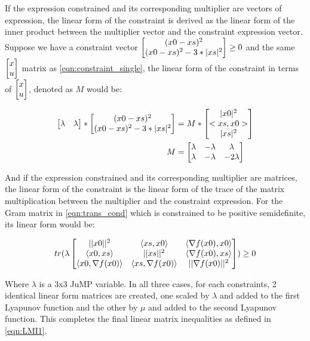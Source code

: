 If the expression constrained and its corresponding multiplier are vectors of expression, the linear form of the constraint is derived as the linear form of the inner product between the multiplier vector and the constraint expression vector. Suppose we have a constraint vector $\begin{bmatrix}(x0-xs)^2 \\ (x0-xs)^2-3*|xs|^2\end{bmatrix} \geq 0$ and the same $\begin{bmatrix}x\\ u\end{bmatrix}$ matrix as \eqref{eqn:constraint_single}, the linear form of the constraint in terms of $\begin{bmatrix}x\\ u\end{bmatrix}$, denoted as $M$ would be:

\begin{subequations} \label{eqn:constraint_vector}
	\begin{align}
    \begin{bmatrix}\lambda  & \lambda \end{bmatrix} * \begin{bmatrix}(x0 - xs)^2 \\ (x0 - xs)^2-3*|xs|^2\end{bmatrix} &= M * \begin{bmatrix}|x0|^2\\ <xs, x0>\\ |xs|^2\end{bmatrix} \label{eq_cons_vector1}       \\
	M &= \begin{bmatrix}\lambda & -\lambda & \lambda \\ \lambda & -\lambda & -2\lambda\end{bmatrix} \label{eq_cons_vector2}
	\end{align}
\end{subequations}

And if the expression constrained and its corresponding multiplier are matrices, the linear form of the constraint is the linear form of the trace of the matrix multiplication between the multiplier and the constraint expression. For the Gram matrix in \eqref{eqn:trans_cond} which is constrained to be positive semidefinite, its linear form would be:

\begin{equation} \label{eqn:trans_cond}
	tr(\lambda \begin{bmatrix}||x0||^2 & \langle xs, x0 \rangle & \langle \nabla f(x0), x0 \rangle \\ \langle x0, xs \rangle & ||xs||^2 & \langle \nabla f(x0), xs \rangle \\ \langle x0, \nabla f(x0) \rangle & \langle xs, \nabla f(x0) \rangle & ||\nabla f(x0)||^2\end{bmatrix}) \geq 0	
\end{equation}

Where $\lambda $ is a 3x3 JuMP variable. In all three cases, for each constraints, 2 identical linear form matrices are created, one scaled by \texttt{$\lambda$} and added to the first Lyapunov function and the other by \texttt{$\mu$} and added to the second Lyapunov function. This completes the final linear matrix inequalities as defined in \eqref{eqn:LMI1}.

